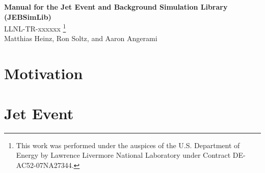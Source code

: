 \documentclass[11pt]{article}
\begin{document}
\renewcommand{\textfraction}{0.1}
\renewcommand{\topfraction}{0.9}
\renewcommand{\bottomfraction}{0.9}
\renewcommand{\floatpagefraction}{0.1}

\begin{center}
{\Large \bf Manual for the Jet Event and Background Simulation Library (JEBSimLib)}\\
\bigskip
LLNL-TR-xxxxxx
\footnote{This work was performed under the auspices of the U.S. Department of Energy by Lawrence Livermore National Laboratory under Contract DE-AC52-07NA27344.}
\\
\bigskip
Matthias Heinz, Ron Soltz, and Aaron Angerami
\end{center}

\begin{abstract}
Jets are the collimated streams of particles resulting from hard scattering in the initial state of high-energy collisions. In heavy-ion collisions, jets interact with the quark-gluon plasma (QGP) before freezeout, providing a probe into the internal structure and properties of the QGP. In order to study jets, background must be subtracted from the measured event, potentially introducing a bias. We aim to understand and quantify this subtraction bias. PYTHIA, a library to simulate pure jet events, is used to simulate a model for a signature with one pure jet (a photon) and one quenched jet, where all quenched particle momenta are reduced by a user-defined constant fraction. Background for the event is simulated using multiplicity values generated by the TRENTO initial state model of heavy-ion collisions fed into a thermal model consisting of a 3-dimensional Boltzmann distribution for particle types and momenta. Data from the simulated events is used to train a statistical model, which computes a posterior distribution of the quench factor for a data set. The model was tested first on pure jet events and then on full events including the background. This model will allow for a quantitative determination of biases induced by various methods of background subtraction.
\end{abstract}

\section{Motivation}

\section{Jet Event}
\end{document}
